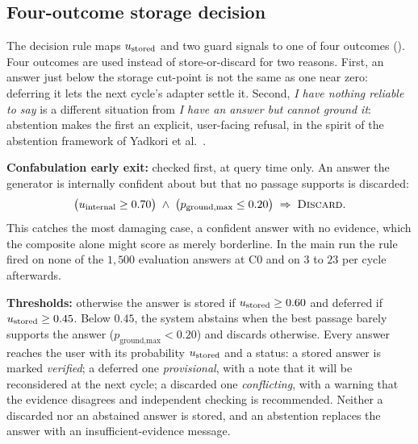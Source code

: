 \subsection{Four-outcome storage decision}
\label{sec:decision}

The decision rule maps $u_{\text{stored}}$ and two guard signals to one of four outcomes (). Four outcomes are used instead of store-or-discard for two reasons. First, an answer just below the storage cut-point is not the same as one near zero: deferring it lets the next cycle's adapter settle it. Second, \emph{I have nothing reliable to say} is a different situation from \emph{I have an answer but cannot ground it}: abstention makes the first an explicit, user-facing refusal, in the spirit of the abstention framework of Yadkori et al.~\cite{yadkori2024abstention}.

\textbf{Confabulation early exit:} checked first, at query time only. An answer the generator is internally confident about but that no passage supports is discarded:
\begin{equation}
\big(u_{\text{internal}} \ge 0.70\big) \;\wedge\; \big(p_{\text{ground,max}} \le 0.20\big)
\;\Rightarrow\; \textsc{Discard}.
\label{eq:early-exit-rule}
\end{equation}
This catches the most damaging case, a confident answer with no evidence, which the composite alone might score as merely borderline. In the main run the rule fired on none of the $1{,}500$ evaluation answers at C0 and on $3$ to $23$ per cycle afterwards.

\textbf{Thresholds:} otherwise the answer is stored if $u_{\text{stored}} \ge 0.60$ and deferred if $u_{\text{stored}} \ge 0.45$. Below $0.45$, the system abstains when the best passage barely supports the answer ($p_{\text{ground,max}} < 0.20$) and discards otherwise. Every answer reaches the user with its probability $u_{\text{stored}}$ and a status: a stored answer is marked \emph{verified}; a deferred one \emph{provisional}, with a note that it will be reconsidered at the next cycle; a discarded one \emph{conflicting}, with a warning that the evidence disagrees and independent checking is recommended. Neither a discarded nor an abstained answer is stored, and an abstention replaces the answer with an insufficient-evidence message.

